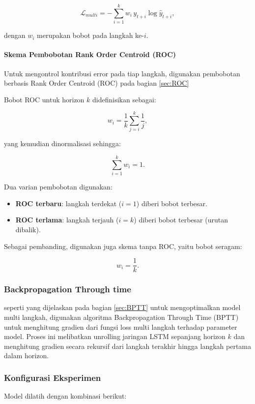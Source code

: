 \[
\mathcal{L}_{multi}
=
-
\sum_{i=1}^{k}
w_i \,
y_{t+i}
\log
\hat{y}_{t+i},
\]

dengan $w_i$ merupakan bobot pada langkah ke-$i$.

\paragraph{Skema Pembobotan Rank Order Centroid (ROC)}

Untuk mengontrol kontribusi error pada tiap langkah, digunakan pembobotan berbasis Rank Order Centroid (ROC) pada bagian \ref{sec:ROC}

Bobot ROC untuk horizon $k$ didefinisikan sebagai:

\[
w_i
=
\frac{1}{k}
\sum_{j=i}^{k}
\frac{1}{j},
\]

yang kemudian dinormalisasi sehingga:

\[
\sum_{i=1}^{k} w_i = 1.
\]

Dua varian pembobotan digunakan:

\begin{itemize}
    \item \textbf{ROC terbaru}: langkah terdekat ($i=1$) diberi bobot terbesar.
    \item \textbf{ROC terlama}: langkah terjauh ($i=k$) diberi bobot terbesar (urutan dibalik).
\end{itemize}

Sebagai pembanding, digunakan juga skema tanpa ROC, yaitu bobot seragam:

\[
w_i = \frac{1}{k}.
\]

\subsubsection{Backpropagation Through time}
seperti  yang dijelaskan pada bagian \ref{sec:BPTT} untuk mengoptimalkan model multi langkah, digunakan algoritma Backpropagation Through Time (BPTT) untuk menghitung gradien dari fungsi loss multi langkah terhadap parameter model. Proses ini melibatkan unrolling jaringan LSTM sepanjang horizon $k$ dan menghitung gradien secara rekursif dari langkah terakhir hingga langkah pertama dalam horizon. 

\subsubsection{Konfigurasi Eksperimen}

Model dilatih dengan kombinasi berikut:

